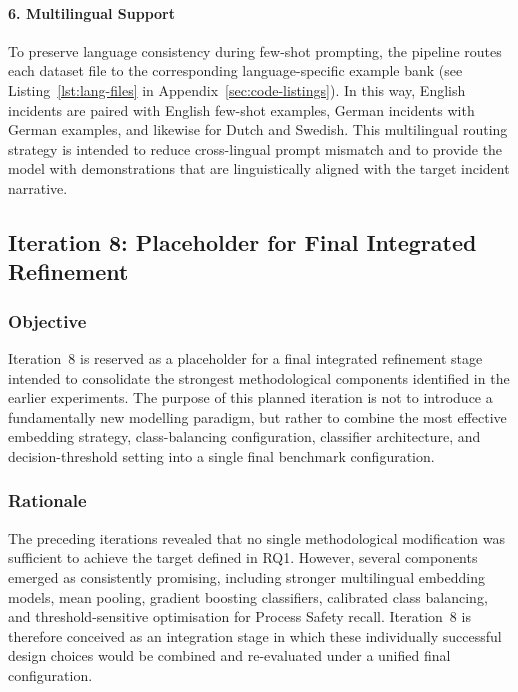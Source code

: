 \documentclass[11pt, titlepage, bibliography=totoc]{scrreprt}
\begin{document}
\paragraph{6. Multilingual Support}
To preserve language consistency during few-shot prompting, the pipeline routes each dataset file to the corresponding language-specific example bank (see Listing~\ref{lst:lang-files} in Appendix~\ref{sec:code-listings}). In this way, English incidents are paired with English few-shot examples, German incidents with German examples, and likewise for Dutch and Swedish. This multilingual routing strategy is intended to reduce cross-lingual prompt mismatch and to provide the model with demonstrations that are linguistically aligned with the target incident narrative.

\subsection{Iteration 8: Placeholder for Final Integrated Refinement}

\subsubsection{Objective}
Iteration~8 is reserved as a placeholder for a final integrated refinement stage intended to consolidate the strongest methodological components identified in the earlier experiments. The purpose of this planned iteration is not to introduce a fundamentally new modelling paradigm, but rather to combine the most effective embedding strategy, class-balancing configuration, classifier architecture, and decision-threshold setting into a single final benchmark configuration.

\subsubsection{Rationale}
The preceding iterations revealed that no single methodological modification was sufficient to achieve the target defined in RQ1. However, several components emerged as consistently promising, including stronger multilingual embedding models, mean pooling, gradient boosting classifiers, calibrated class balancing, and threshold-sensitive optimisation for Process Safety recall. Iteration~8 is therefore conceived as an integration stage in which these individually successful design choices would be combined and re-evaluated under a unified final configuration.
\end{document}
